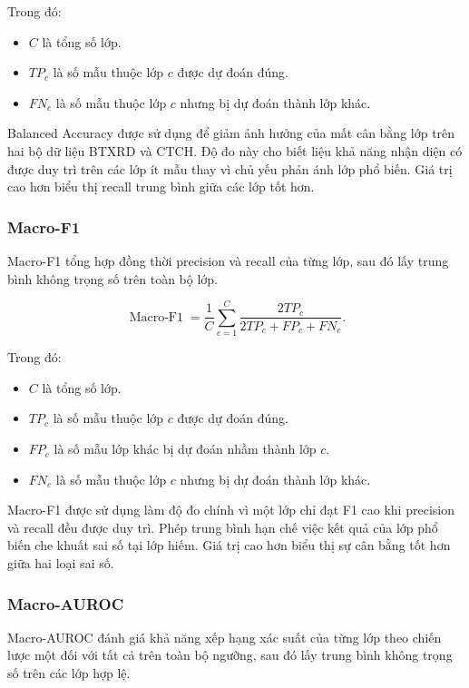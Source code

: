 Trong đó:
\begin{itemize}
    \item $C$ là tổng số lớp.
    \item $TP_c$ là số mẫu thuộc lớp $c$ được dự đoán đúng.
    \item $FN_c$ là số mẫu thuộc lớp $c$ nhưng bị dự đoán thành lớp khác.
\end{itemize}

Balanced Accuracy được sử dụng để giảm ảnh hưởng của mất cân bằng lớp trên hai bộ dữ liệu BTXRD và CTCH. Độ đo này cho biết liệu khả năng nhận diện có được duy trì trên các lớp ít mẫu thay vì chủ yếu phản ánh lớp phổ biến. Giá trị cao hơn biểu thị recall trung bình giữa các lớp tốt hơn.

\subsubsection{Macro-F1}

Macro-F1 tổng hợp đồng thời precision và recall của từng lớp, sau đó lấy trung bình không trọng số trên toàn bộ lớp.

\begin{equation}\operatorname{Macro\text{-}F1}=\frac{1}{C}\sum_{c=1}^{C}\frac{2TP_c}{2TP_c+FP_c+FN_c}.\label{eq:ch4_macro_f1}\end{equation}

Trong đó:
\begin{itemize}
    \item $C$ là tổng số lớp.
    \item $TP_c$ là số mẫu thuộc lớp $c$ được dự đoán đúng.
    \item $FP_c$ là số mẫu lớp khác bị dự đoán nhầm thành lớp $c$.
    \item $FN_c$ là số mẫu thuộc lớp $c$ nhưng bị dự đoán thành lớp khác.
\end{itemize} 

Macro-F1 được sử dụng làm độ đo chính vì một lớp chỉ đạt F1 cao khi precision và recall đều được duy trì. Phép trung bình hạn chế việc kết quả của lớp phổ biến che khuất sai số tại lớp hiếm. Giá trị cao hơn biểu thị sự cân bằng tốt hơn giữa hai loại sai số.

\subsubsection{Macro-AUROC}

Macro-AUROC \cite{Fawcett2006ROC} đánh giá khả năng xếp hạng xác suất của từng lớp theo chiến lược một đối với tất cả trên toàn bộ ngưỡng, sau đó lấy trung bình không trọng số trên các lớp hợp lệ. 


